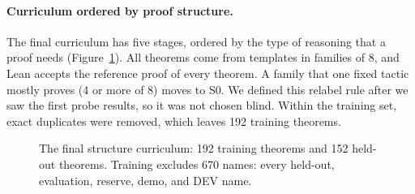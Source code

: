 \documentclass[11pt]{article}
\begin{document}
\paragraph{Curriculum ordered by proof structure.}
The final curriculum has five stages, ordered by the type of reasoning that a proof needs (Figure~\ref{fig:stairs}).
All theorems come from templates in families of 8, and Lean accepts the reference proof of every theorem.
A family that one fixed tactic mostly proves (4 or more of 8) moves to S0.
We defined this relabel rule after we saw the first probe results, so it was not chosen blind.
Within the training set, exact duplicates were removed, which leaves 192 training theorems.

\begin{figure}[!htbp]
\centering
{}
\caption{The final structure curriculum: 192 training theorems and 152 held-out theorems. Training excludes 670 names: every held-out, evaluation, reserve, demo, and DEV name.}
\label{fig:stairs}
\end{figure}
\end{document}
